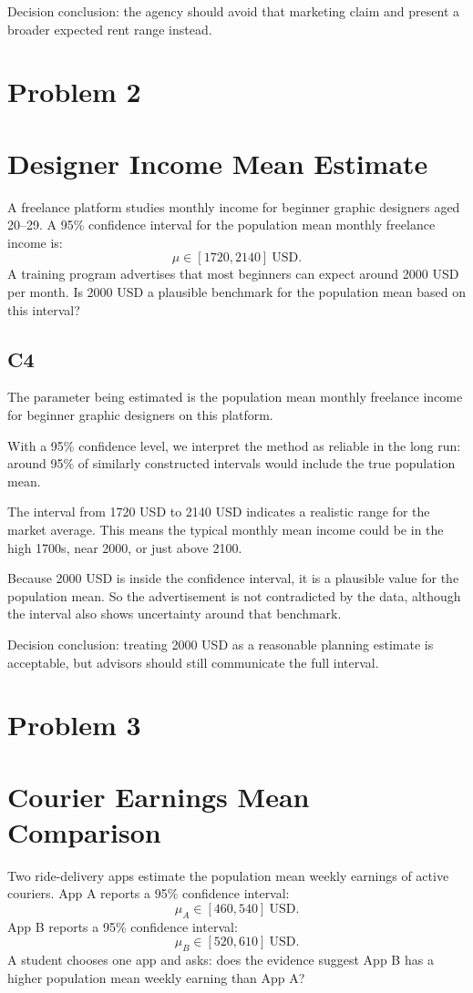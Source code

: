 \begin{ExamProblems}
		Decision conclusion: the agency should avoid that marketing claim and present a broader expected rent range instead.

		\newpage
		\item
		\section{Problem 2}
		\section{Designer Income Mean Estimate}
		A freelance platform studies monthly income for beginner graphic designers aged 20--29.
		A 95\% confidence interval for the population mean monthly freelance income is:
		\[
		\mu \in [1720, 2140]\ \text{USD}.
		\]
		A training program advertises that most beginners can expect around 2000 USD per month.
		Is 2000 USD a plausible benchmark for the population mean based on this interval?

		\subsection*{C4}
		The parameter being estimated is the population mean monthly freelance income for beginner graphic designers on this platform.

		With a 95\% confidence level, we interpret the method as reliable in the long run: around 95\% of similarly constructed intervals would include the true population mean.

		The interval from 1720 USD to 2140 USD indicates a realistic range for the market average.
		This means the typical monthly mean income could be in the high 1700s, near 2000, or just above 2100.

		Because 2000 USD is inside the confidence interval, it is a plausible value for the population mean.
		So the advertisement is not contradicted by the data, although the interval also shows uncertainty around that benchmark.

		Decision conclusion: treating 2000 USD as a reasonable planning estimate is acceptable, but advisors should still communicate the full interval.

		\newpage
		\item
		\section{Problem 3}
		\section{Courier Earnings Mean Comparison}
		Two ride-delivery apps estimate the population mean weekly earnings of active couriers.
		App A reports a 95\% confidence interval:
		\[
		\mu_A \in [460, 540]\ \text{USD}.
		\]
		App B reports a 95\% confidence interval:
		\[
		\mu_B \in [520, 610]\ \text{USD}.
		\]
		A student chooses one app and asks: does the evidence suggest App B has a higher population mean weekly earning than App A?


\end{ExamProblems}
